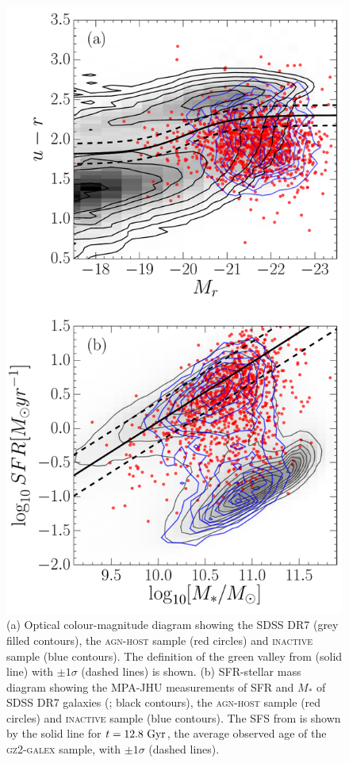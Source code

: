 \begin{figure}
\centering
\includegraphics[height=0.75\textheight]{agn/fig3.pdf}
\caption[Colour-magnitude and SFR-mass diagram for \textsc{agn-host} galaxies]{(a) Optical colour-magnitude diagram showing the SDSS DR7 (grey filled contours), the \textsc{agn-host} sample (red circles) and \textsc{inactive} sample (blue contours). The definition of the green valley from \citet{Baldry06} (solid line) with $\pm 1\sigma$ (dashed lines) is shown. (b) SFR-stellar mass diagram showing the MPA-JHU measurements of SFR and $M_*$ of SDSS DR7 galaxies (\citealt{kauffmann03, brinchmann04}; black contours), the \textsc{agn-host} sample (red circles) and \textsc{inactive} sample (blue contours). The SFS from \citet{peng10} is shown by the solid line for $t = 12.8~\rm{Gyr}$, the average observed age of the \textsc{gz2-galex} sample, with $\pm1\sigma$ (dashed lines).}
\label{cmdsfms}
\end{figure}


